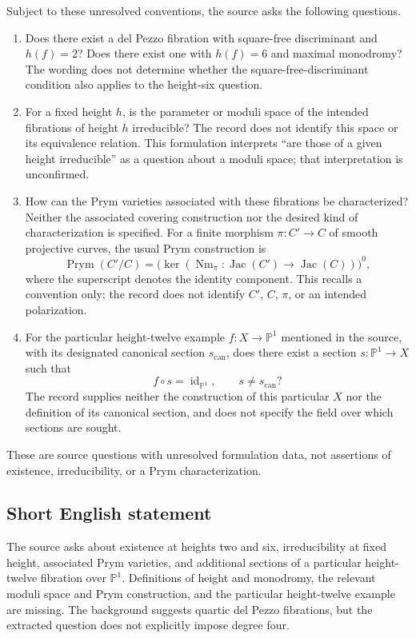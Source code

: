 \documentclass[11pt]{article}
\begin{document}
Subject to these unresolved conventions, the source asks the following questions.
\begin{enumerate}
\item Does there exist a del Pezzo fibration with square-free discriminant and \(h(f)=2\)? Does there exist one with \(h(f)=6\) and maximal monodromy? The wording does not determine whether the square-free-discriminant condition also applies to the height-six question.
\item For a fixed height \(h\), is the parameter or moduli space of the intended fibrations of height \(h\) irreducible? The record does not identify this space or its equivalence relation. This formulation interprets ``are those of a given height irreducible'' as a question about a moduli space; that interpretation is unconfirmed.
\item How can the Prym varieties associated with these fibrations be characterized? Neither the associated covering construction nor the desired kind of characterization is specified. For a finite morphism \(\pi\colon C'\to C\) of smooth projective curves, the usual Prym construction is
\[
\operatorname{Prym}(C'/C)=\bigl(\ker(\operatorname{Nm}_{\pi}\colon\operatorname{Jac}(C')\to\operatorname{Jac}(C))\bigr)^0,
\]
where the superscript denotes the identity component. This recalls a convention only; the record does not identify \(C'\), \(C\), \(\pi\), or an intended polarization.
\item For the particular height-twelve example \(f\colon X\to\mathbb P^1\) mentioned in the source, with its designated canonical section \(s_{\mathrm{can}}\), does there exist a section \(s\colon\mathbb P^1\to X\) such that
\[
f\circ s=\operatorname{id}_{\mathbb P^1},\qquad s\ne s_{\mathrm{can}}?
\]
The record supplies neither the construction of this particular \(X\) nor the definition of its canonical section, and does not specify the field over which sections are sought.
\end{enumerate}
These are source questions with unresolved formulation data, not assertions of existence, irreducibility, or a Prym characterization.
\subsection{Short English statement}
The source asks about existence at heights two and six, irreducibility at fixed height, associated Prym varieties, and additional sections of a particular height-twelve fibration over \(\mathbb P^1\). Definitions of height and monodromy, the relevant moduli space and Prym construction, and the particular height-twelve example are missing. The background suggests quartic del Pezzo fibrations, but the extracted question does not explicitly impose degree four.
\end{document}
